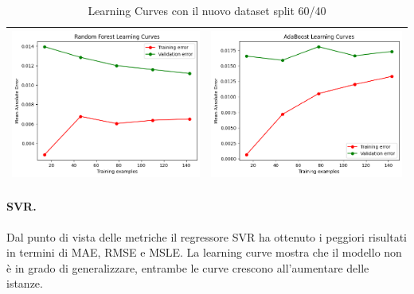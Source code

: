 \begin{table}[H]
\begin{tabularx}{\textwidth}{|X|X|}
        \includegraphics[width=\linewidth, trim=0 0 0 0]{images/RandomForest_lc60.png} &
        \includegraphics[width=\linewidth, trim=0 0 0 0]{images/AdaBoost_lc60.png} \\
        \hline
    \end{tabularx}
    \caption{Learning Curves con il nuovo dataset split 60/40}
    \label{tab:emissions_info}
\end{table}

\paragraph{\textbf{SVR}.}
Dal punto di vista delle metriche il regressore SVR ha ottenuto i peggiori risultati in termini di MAE, RMSE e MSLE. La learning curve mostra che il modello non è in grado di generalizzare, entrambe le curve crescono all'aumentare delle istanze.

